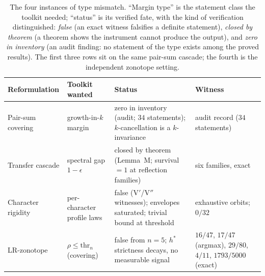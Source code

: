 \begin{table}[htbp]
\centering
\small
\caption{The four instances of type mismatch. ``Margin type'' is the
statement class the toolkit needed; ``status'' is its verified fate,
with the kind of verification distinguished: \emph{false} (an exact
witness falsifies a definite statement), \emph{closed by theorem} (a
theorem shows the instrument cannot produce the output), and
\emph{zero in inventory} (an audit finding: no statement of the type
exists among the proved results). The first three rows sit on the same
pair-sum cascade; the fourth is the independent zonotope setting.}
\label{tab:instances}
\begin{tabularx}{\textwidth}{@{} l >{\raggedright\arraybackslash}X
>{\raggedright\arraybackslash}X l @{}}
\toprule
Reformulation & Toolkit wanted & Status & Witness \\
\midrule
Pair-sum covering & growth-in-$k$ margin & zero in inventory (audit;
$34$ statements); $k$-cancellation is a $k$-invariance & audit record
($34$ statements) \\
Transfer cascade & spectral gap $1-\epsilon$ & closed by theorem
(Lemma~M; survival $=1$ at reflection families) & six families, exact \\
Character rigidity & per-character profile laws & false (V$'$/V$''$
witnesses); envelopes saturated; trivial bound at threshold &
exhaustive orbits; $0/32$ \\
LR-zonotope & $\rho\le\mathrm{thr}_n$ (covering) & false from $n=5$;
$h^*$ strictness decays, no measurable signal & $16/47$, $17/47$
(argmax), $29/80$, $4/11$, $1793/5000$ (exact) \\
\bottomrule
\end{tabularx}
\end{table}
